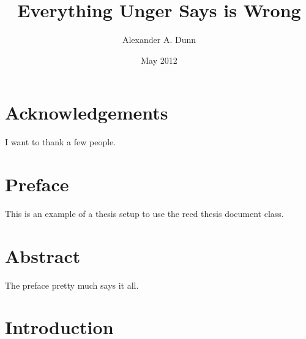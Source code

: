 \documentclass[12pt,twoside]{reedthesis}
\title{Everything Unger Says is Wrong}
\author{Alexander A. Dunn}
\date{May 2012}
\begin{document}
  \maketitle
  \frontmatter %
  \pagestyle{empty} %

    \chapter*{Acknowledgements}
	I want to thank a few people.

    \chapter*{Preface}
	This is an example of a thesis setup to use the reed thesis document class.

    \tableofcontents
    \listoftables
    \listoffigures

    \chapter*{Abstract}
	The preface pretty much says it all.

  \mainmatter %
  \pagestyle{fancyplain} %


    \chapter*{Introduction}

	
\end{document}
